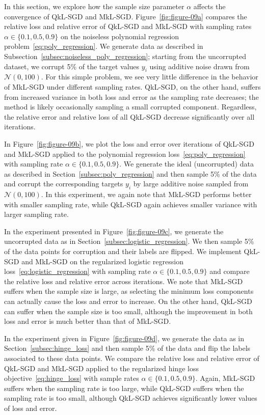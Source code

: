 \documentclass[11pt]{article}
\begin{document}
In this section, we explore how the sample size parameter $\alpha$ affects the convergence of QkL-SGD and MkL-SGD. Figure~\ref{fig:figure-09a} compares the relative loss and relative error of QkL-SGD and MkL-SGD with sampling rates $\alpha \in \{0.1, 0.5, 0.9\}$ on the noiseless polynomial regression problem~\eqref{eq:poly_regression}. We generate data as described in Subsection~\ref{subsec:noiseless_poly_regression}; starting from the uncorrupted dataset, we corrupt 5\% of the target values $y_i$ using additive noise drawn from $\mathcal{N}(0,100)$.  For this simple problem, we see very little difference in the behavior of MkL-SGD under different sampling rates.  QkL-SGD, on the other hand, suffers from increased variance in both loss and error as the sampling rate decreases; the method is likely occasionally sampling a small corrupted component.  Regardless, the relative error and relative loss of all QkL-SGD decrease significantly over all iterations.


In Figure~\ref{fig:figure-09b}, we plot the loss and error over iterations of QkL-SGD and MkL-SGD applied to the polynomial regression loss~\eqref{eq:poly_regression} with sampling rate $\alpha \in \{0.1, 0.5, 0.9\}$.  We generate the ideal (uncorrupted) data as described in Section~\ref{subsec:poly_regression} and then sample 5\% of the data and corrupt the corresponding targets $y_i$ by large additive noise sampled from $\mathcal{N}(0,100)$.  In this experiment, we again note that MkL-SGD performs better with smaller sampling rate, while QkL-SGD again achieves smaller variance with larger sampling rate.


In the experiment presented in Figure~\ref{fig:figure-09c}, we generate the uncorrupted
data as in Section~\ref{subsec:logistic_regression}.  We then sample 5\% of the data points for corruption and their labels are flipped.  We implement QkL-SGD and MkL-SGD on the regularized logistic regression loss~\eqref{eq:logistic_regression} with sampling rate $\alpha \in \{0.1,0.5,0.9\}$ and compare the relative loss and relative error across iterations.  We note that MkL-SGD suffers when the sample size is large, as selecting the minimum loss components can actually cause the loss and error to increase.  On the other hand, QkL-SGD can suffer when the sample size is too small, although the improvement in both loss and error is much better than that of MkL-SGD.


In the experiment given in Figure~\ref{fig:figure-09d}, we generate the data as in Section~\ref{subsec:hinge_loss} and then sample 5\% of the data and flip the labels associated to these data points.  We compare the relative loss and relative error of QkL-SGD and MkL-SGD applied to the regularized hinge loss objective~\eqref{eq:hinge_loss} with sample rates $\alpha \in \{0.1, 0.5, 0.9\}$.  Again, MkL-SGD suffers when the sampling rate is too large, while QkL-SGD suffers when the sampling rate is too small, although QkL-SGD achieves significantly lower values of loss and error.
\end{document}

